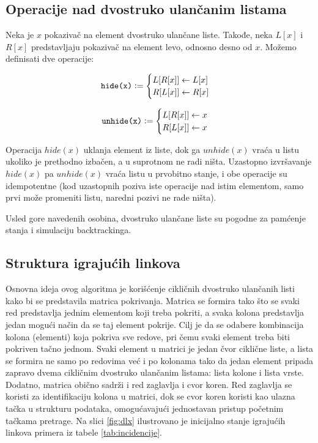 \documentclass[a4paper]{article}
\begin{document}
{\subsection{Operacije nad dvostruko ulančanim listama}

Neka je \( x \) pokazivač na element dvostruko ulančane liste. Takođe, neka \( L[x] \) i \( R[x] \)
predstavljaju pokazivač na element levo, odnosno desno od \( x \). Možemo definisati dve operacije:

\begin{minipage}{0.45\textwidth}
  \[
  \texttt{hide(x)} \vcentcolon =
  \begin{cases}
    L[R[x]] \gets L[x] \\
    R[L[x]] \gets R[x]
  \end{cases}
  \]
\end{minipage}
\begin{minipage}{0.45\textwidth}
  \[
  \texttt{unhide(x)} \vcentcolon =
  \begin{cases}
    L[R[x]] \gets x \\
    R[L[x]] \gets x
  \end{cases}
  \]
\end{minipage}


Operacija \( hide(x) \) uklanja element iz liste, dok ga \( unhide(x) \) vraća u listu ukoliko
je prethodno izbačen, a u suprotnom ne radi ništa. Uzastopno izvršavanje \( hide(x) \) pa \( unhide(x) \)
vraća listu u prvobitno stanje, i obe operacije su idempotentne (kod uzastopnih poziva iste operacije nad
istim elementom, samo prvi može promeniti listu, naredni pozivi ne rade ništa).

Usled gore navedenih osobina, dvostruko ulančane liste su pogodne za pamćenje stanja i simulaciju backtrackinga.

\subsection{Struktura igrajućih linkova}
Osnovna ideja ovog algoritma je korišćenje cikličnih dvostruko ulančanih listi kako bi se predstavila
matrica pokrivanja. Matrica se formira tako što se svaki red predstavlja jednim elementom koji treba
pokriti, a svaka kolona predstavlja jedan mogući način da se taj element pokrije. Cilj je da se odabere
kombinacija kolona (elementi) koja pokriva sve redove, pri čemu svaki element treba biti pokriven tačno
jednom. Svaki element u matrici je jedan čvor ciklične liste, a lista se formira ne samo po redovima već
i po kolonama tako da jedan element pripada zapravo dvema cikličnim dvostruko ulančanim listama: lista
kolone i lista vrste. Dodatno, matrica obično sadrži i red zaglavlja i cvor koren. Red zaglavlja se
koristi za identifikaciju kolona u matrici, dok se cvor koren koristi kao ulazna tačka u strukturu
podataka, omogućavajući jednostavan pristup početnim tačkama pretrage. Na slici \ref{fig:dlx} ilustrovano
je inicijalno stanje igrajućih linkova primera iz tabele \ref{tab:incidencije}.

}
\end{document}
